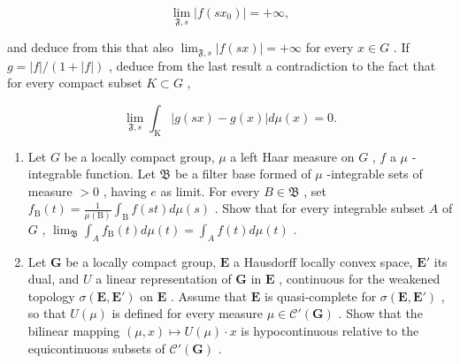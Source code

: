 \[
\lim _ {\mathfrak {F}, s} | f (s x _ {0}) | = + \infty ,
\]

and deduce from this that also \(\lim_{\mathfrak{F},s}|f(sx)| = +\infty\) for every \(x \in G\) . If \(g = |f| / (1 + |f|)\) , deduce from the last result a contradiction to the fact that for every compact subset \(K \subset G\) ,

\[
\lim _ {\mathfrak {F}, s} \int_ {\mathrm{K}} | g (s x) - g (x) | d \mu (x) = 0.
\]

\begin{enumerate}
\def\labelenumi{\arabic{enumi})}
\setcounter{enumi}{8}
\item
  Let \(G\) be a locally compact group, \(\mu\) a left Haar measure on \(G\) , \(f\) a \(\mu\) -integrable function. Let \(\mathfrak{B}\) be a filter base formed of \(\mu\) -integrable sets of measure \(> 0\) , having \(e\) as limit. For every \(B \in \mathfrak{B}\) , set \(f_{\mathrm{B}}(t) = \frac{1}{\mu(\mathrm{B})} \int_{\mathrm{B}} f(st) d\mu(s)\) . Show that for every integrable subset \(A\) of \(G\) , \(\lim_{\mathfrak{B}} \int_{A} f_{\mathrm{B}}(t) d\mu(t) = \int_{A} f(t) d\mu(t)\) .
\item
  Let \(\mathbf{G}\) be a locally compact group, \(\mathbf{E}\) a Hausdorff locally convex space, \(\mathbf{E}'\) its dual, and \(U\) a linear representation of \(\mathbf{G}\) in \(\mathbf{E}\) , continuous for the weakened topology \(\sigma(\mathbf{E},\mathbf{E}')\) on \(\mathbf{E}\) . Assume that \(\mathbf{E}\) is quasi-complete for \(\sigma(\mathbf{E},\mathbf{E}')\) , so that \(U(\mu)\) is defined for every measure \(\mu \in \mathcal{C}'(\mathbf{G})\) . Show that the bilinear mapping \((\mu,x) \mapsto U(\mu) \cdot x\) is hypocontinuous relative to the equicontinuous subsets of \(\mathcal{C}'(\mathbf{G})\) .
\end{enumerate}

